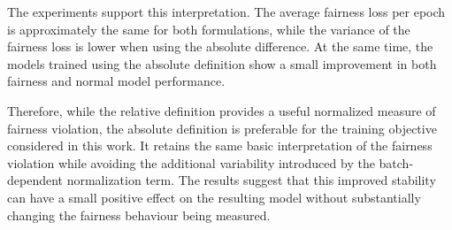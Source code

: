 The experiments support this interpretation. The average fairness loss per epoch is approximately the same for both formulations, while the variance of the fairness loss is lower when using the absolute difference. At the same time, the models trained using the absolute definition show a small improvement in both fairness and normal model performance.

Therefore, while the relative definition provides a useful normalized measure of fairness violation, the absolute definition is preferable for the training objective considered in this work. It retains the same basic interpretation of the fairness violation while avoiding the additional variability introduced by the batch-dependent normalization term. The results suggest that this improved stability can have a small positive effect on the resulting model without substantially changing the fairness behaviour being measured.